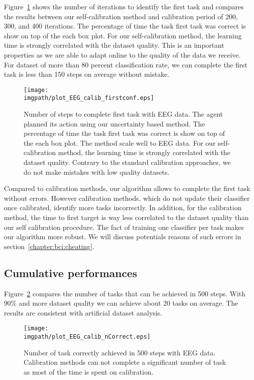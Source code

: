 Figure~\ref{fig:firstEEG} shows the number of iterations to identify the first task and compares the results between our self-calibration method and calibration period of 200, 300, and 400 iterations. The percentage of time the task first task was correct is show on top of the each box plot. For our self-calibration method, the learning time is strongly correlated with the dataset quality. This is an important properties as we are able to adapt online to the quality of the data we receive. For dataset of more than 80 percent classification rate, we can complete the first task is less than 150 steps on average without mistake.

\begin{figure}[!htbp]
\centering
\texttt{[image: \\imgpath/plot\_EEG\_calib\_firstconf.eps]}
\caption{Number of steps to complete first task with EEG data. The agent planned its action using our uncertainty based method. The percentage of time the task first task was correct is show on top of the each box plot. The method scale well to EEG data. For our self-calibration method, the learning time is strongly correlated with the dataset quality. Contrary to the standard calibration approaches, we do not make mistakes with low quality datasets.}
\label{fig:firstEEG}
\end{figure} 

Compared to calibration methods, our algorithm allows to complete the first task without errors. However calibration methods, which do not update their classifier once calibrated, identify more tasks incorrectly. In addition, for the calibration method, the time to first target is way less correlated to the dataset quality than our self calibration procedure. The fact of training one classifier per task makes our algorithm more robust. We will discuss potentials reasons of such errors in section~\ref{chapter:bci:cheating}.

\subsection{Cumulative performances}

Figure~\ref{fig:nCorrectEEG} compares the number of tasks that can be achieved in 500 steps. With 90\% and more dataset quality we can achieve about 20 tasks on average. The results are consistent with artificial dataset analysis.

\begin{figure}[!htbp]
\centering
\texttt{[image: \\imgpath/plot\_EEG\_calib\_nCorrect.eps]}
\caption{Number of task correctly achieved in 500 steps with EEG data. Calibration methods can not complete a significant number of task as most of the time is spent on calibration.}
\label{fig:nCorrectEEG}
\end{figure} 

